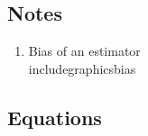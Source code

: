 \documentclass[a4paper]{article}
\begin{document}
\subsection{Notes}
\begin{enumerate}
\item Bias of an estimator \\
  includegraphics{bias}
\end{enumerate}

\subsection{Equations}
    
\end{document}
